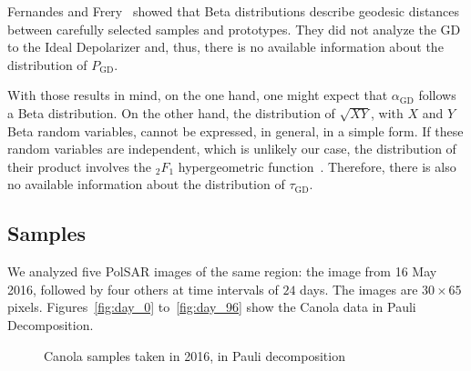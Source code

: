 \documentclass[journal]{IEEEtran}
\begin{document}
{Fernandes and Frery~\cite{StatisticalPropertiesofGeodesicDistancesBetweenSamplesandElementaryScatterersinPolSARImagery2019} showed that Beta distributions describe geodesic distances between carefully selected samples and prototypes.
They did not analyze the GD to the Ideal Depolarizer and, thus, there is no available information about the distribution of $P_{\text{GD}}$.

With those results in mind, on the one hand, one might expect that $\alpha_{\text{GD}}$ follows a Beta distribution.
On the other hand, the distribution of $\sqrt{XY}$, with $X$ and $Y$ Beta random variables, cannot be expressed, in general, in a simple form.
If these random variables are independent, which is unlikely our case, the distribution of their product involves the ${}_2F_{1}$ hypergeometric function~\cite[Corollary~2.1]{OntheDistributionoftheProductofIndependentBetaRandomVariables}.
Therefore, there is also no available information about the distribution of $\tau_{\text{GD}}$.

\subsection{Samples}

We analyzed five PolSAR images of the same region: the image from 16 May 2016, followed by four others at time intervals of $24$ days. 
The images are $30 \times 65$ pixels.
Figures~\ref{fig:day_0} to~\ref{fig:day_96} show the Canola data in Pauli Decomposition. 

\begin{figure}[hbt]
	\centering
	\caption{Canola samples taken in 2016, in Pauli decomposition}
	\label{fig:sample_images}
\end{figure}

}
\end{document}
